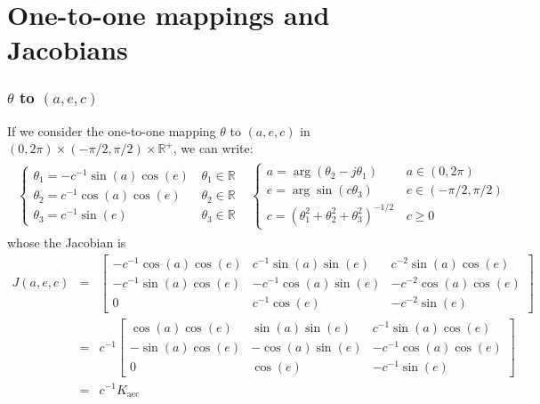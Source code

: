 \documentclass[a4paper, 12pt]{report}
\def\aec{\mathrm{aec}}
\begin{document}
\section{One-to-one mappings and Jacobians}
\subsubsection{$\theta$ to $(a,e,c)$ }
If we consider the one-to-one mapping $\theta$ to $(a,e,c)$ in $(0,2\pi)\times(-\pi/2,\pi/2)\times\mathds{R}^+$, we can write:
\begin{eqnarray*}
\begin{array}{cc}
 \left\{
 \begin{array}{ll}
 \theta_{1}=-c^{-1} \sin(a)\cos(e)&\, \theta_{1}\in\mathds{R}
 \\
 \theta_{2}=c^{-1}  \cos(a)\cos(e)&\,\theta_{2}\in\mathds{R}
 \\
 \theta_{3}=c^{-1}\sin(e)&\, \theta_{3}\in\mathds{R}
 \end{array}\right.
&
 \left\{
 \begin{array}{ll}
 a=\arg(\theta_{2}-j \theta_{1})& \, a\in(0,2\pi)
  \\
e=\arg\sin(c\theta_{3})& \,e\in(-\pi/2,\pi/2)
 \\
 c=(\theta_{1}^{2}+ \theta_{2}^{2}+ \theta_{3}^{2})^{-1/2}& \, c \geq 0
 \end{array}\right.
\end{array}
\end{eqnarray*}
whose the Jacobian is
\begin{eqnarray}
 \label{eq:jacobianaec2theta}
 J(a,e,c)
&= &
 \begin{bmatrix}
-c^{-1}\cos(a)\cos(e)&c^{-1}\sin(a)\sin(e)&c^{-2}\sin(a)\cos(e)
\\
-c^{-1}\sin(a)\cos(e)&-c^{-1}\cos(a)\sin(e)&-c^{-2}\cos(a)\cos(e)
\\
0&c^{-1}\cos(e)&-c^{-2}\sin(e)
\end{bmatrix}
\\
&=&\nonumber
c^{-1}
\begin{bmatrix}
\cos(a)\cos(e)&\sin(a)\sin(e)&c^{-1}\sin(a)\cos(e)
\\
-\sin(a)\cos(e)&-\cos(a)\sin(e)&-c^{-1}\cos(a)\cos(e)
\\
0&\cos(e)&-c^{-1}\sin(e)
\end{bmatrix}
\\
&=&\nonumber
c^{-1}K_{\aec}
\end{eqnarray}
\end{document}
